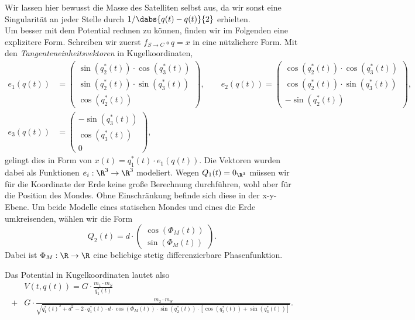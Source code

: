 \documentclass{subfiles}
\begin{document}
        Wir lassen hier bewusst die Masse des Satelliten selbst aus, da wir sonst eine Singularität an jeder Stelle durch $1/\dabs{q(t)-q(t)}{2}$ erhielten.\\

        Um besser mit dem Potential rechnen zu können, finden wir im Folgenden eine explizitere Form. Schreiben wir zuerst $f_{S\to C}\circ q = x$ in eine nützlichere Form. Mit den \textit{Tangenteneinheitsvektoren} in Kugelkoordinaten,
        \begin{align*}
            e_1(q(t)) &= \begin{pmatrix}\sin(q_2^*(t))\cdot\cos(q_3^*(t))\\ \sin(q_2^*(t))\cdot\sin(q_3^*(t))\\ \cos(q_2^*(t))\end{pmatrix},\qquad
            e_2(q(t)) = \begin{pmatrix}\cos(q_2^*(t))\cdot\cos(q_3^*(t))\\ \cos(q_2^*(t))\cdot\sin(q_3^*(t))\\ -\sin(q_2^*(t))\end{pmatrix},\\
            e_3(q(t)) &= \begin{pmatrix}-\sin(q_3^*(t))\\ \cos(q_3^*(t))\\ 0\end{pmatrix},
        \end{align*}
        gelingt dies in Form von $x(t) = q_1^*(t)\cdot e_1(q(t))$. Die Vektoren wurden dabei als Funktionen $e_i: \R^3\to \R^3$ modeliert. Wegen $Q_1(t)=0_{\R^3}$ müssen wir für die Koordinate der Erde keine große Berechnung durchführen, wohl aber für die Position des Mondes. Ohne Einschränkung befinde sich diese in der x-y-Ebene. Um beide Modelle eines statischen Mondes und eines die Erde umkreisenden, wählen wir die Form 
        \[
            Q_2(t) = d\cdot\begin{pmatrix}\cos(\Phi_M(t))\\\sin(\Phi_M(t))\end{pmatrix}.
        \]
        Dabei ist $\Phi_M: \R\to \R$ eine beliebige stetig differenzierbare Phasenfunktion.

        \begin{ergebnis}
            Das Potential in Kugelkoordinaten lautet also 
            \begin{align*}
                &V(t, q(t)) = G\cdot \frac{m_1\cdot m_S}{q_1^*(t)}\\
                +& G\cdot \frac{m_2\cdot m_S}{\sqrt{q_1^*(t)^2 + d^2 - 2\cdot q_1^*(t)\cdot d\cdot\cos(\Phi_M(t))\cdot\sin(q_2^*(t))\cdot[\cos(q_3^*(t)) + \sin(q_3^*(t))]}}.
            \end{align*}
        \end{ergebnis}
\end{document}
